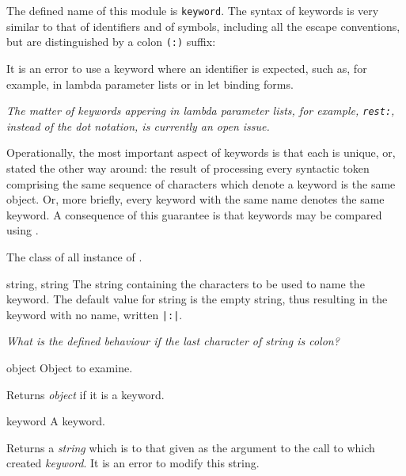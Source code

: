 \label{keyword}
%
\begin{optDefinition}
The defined name of this module is {\tt keyword}.
%
%
The syntax of keywords is very similar to that of identifiers and of symbols,
including all the escape conventions, but are distinguished by a colon {\tt (:)}
suffix:
%
\Syntax
{}%
%

It is an error to use a keyword where an identifier is expected, such as, for
example, in lambda parameter lists or in let binding forms.

{\em The matter of keywords appering in lambda parameter lists, for example,
    {\tt rest:}, instead of the dot notation, is currently an open issue.}

Operationally, the most important aspect of keywords is that each is unique, or,
stated the other way around: the result of processing every syntactic token
comprising the same sequence of characters which denote a keyword is the same
object. Or, more briefly, every keyword with the same name denotes the same
keyword. A consequence of this guarantee is that keywords may be compared using
.

%
The class of all instance of .
%
\begin{initoptions}
    \item[string, string] The string containing the characters to be used to
    name the keyword. The default value for string is the empty string, thus
    resulting in the keyword with no name, written \verb+|:|+.
\end{initoptions}
%
{\em What is the defined behaviour if the last character of string is colon?}

%
\begin{arguments}
    \item[object] Object to examine.
\end{arguments}
%
\result%
Returns {\em object\/} if it is a keyword.

%
\begin{arguments}
    \item[keyword] A keyword.
\end{arguments}
%
\result%
Returns a {\em string\/} which is  to that given as
the argument to the call to  which created {\em keyword}. It
is an error to modify this string.


\end{optDefinition}
